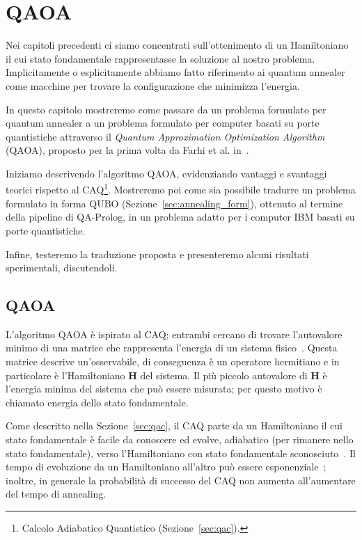 \chapter{QAOA}
\label{ch:qaoa}
Nei capitoli precedenti ci siamo concentrati sull'ottenimento di un Hamiltoniano il cui stato fondamentale rappresentasse la soluzione al nostro problema. Implicitamente o esplicitamente abbiamo fatto riferimento ai quantum annealer come macchine per trovare la configurazione che minimizza l'energia.

In questo capitolo mostreremo come passare da un problema formulato per quantum annealer a un problema formulato per computer basati su porte quantistiche attraverso il \emph{Quantum Approximation Optimization Algorithm} (QAOA), proposto per la prima volta da Farhi et al. in~\cite{farhi2014quantum}.

Iniziamo descrivendo l'algoritmo QAOA, evidenziando vantaggi e svantaggi teorici rispetto al CAQ\footnote{Calcolo Adiabatico Quantistico (Sezione~\ref{sec:qac}).}. Mostreremo poi come sia possibile tradurre un problema formulato in forma QUBO (Sezione~\ref{sec:annealing_form}), ottenuto al termine della pipeline di QA-Prolog, in un problema adatto per i computer IBM basati su porte quantistiche.

Infine, testeremo la traduzione proposta e presenteremo alcuni risultati sperimentali, discutendoli.
\section{QAOA}
L'algoritmo QAOA è ispirato al CAQ; entrambi cercano di trovare l'autovalore minimo di una matrice che rappresenta l'energia di un sistema fisico~\cite{fakhimi2023quantum}. Questa matrice descrive un'osservabile, di conseguenza è un operatore hermitiano e in particolare è l'Hamiltoniano $\mathbf{H}$ del sistema. Il più piccolo autovalore di $\mathbf{H}$ è l'energia minima del sistema che può essere misurata; per questo motivo è chiamato energia dello stato fondamentale.

Come descritto nella Sezione~\ref{sec:qac}, il CAQ parte da un Hamiltoniano il cui stato fondamentale è facile da conoscere ed evolve, adiabatico (per rimanere nello stato fondamentale), verso l'Hamiltoniano con stato fondamentale sconosciuto~\cite{fakhimi2023quantum}. Il tempo di evoluzione da un Hamiltoniano all'altro può essere esponenziale~\cite{farhi2014quantum}; inoltre, in generale la probabilità di successo del CAQ non aumenta all'aumentare del tempo di annealing.

